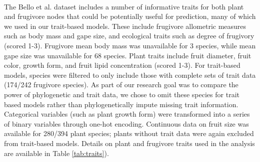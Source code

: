 \paragraph*{}
The Bello et al. dataset includes a number of informative traits for both plant and frugivore nodes that could be potentially useful for prediction, many of which we used in our trait-based models. These include frugivore allometric measures such as body mass and gape size, and ecological traits such as degree of frugivory (scored 1-3). Frugivore mean body mass was unavailable for 3 species, while mean gape size was unavailable for 68 species. Plant traits include fruit diameter, fruit color, growth form, and fruit lipid concentration (scored 1-3). For trait-based models, species were filtered to only include those with complete sets of trait data (174/242 frugivore species). As part of our research goal was to compare the power of phylogenetic and trait data, we chose to omit these species for trait based models rather than phylogenetically impute missing trait information. Categorical variables (such as plant growth form) were transformed into a series of binary variables through one-hot encoding. Continuous data on fruit size was available for 280/394 plant species; plants without trait data were again excluded from trait-based models. Details on plant and frugivore traits used in the analysis are available in Table \ref{tab:traits}). 
    

